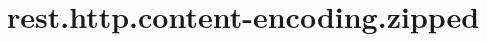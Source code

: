 \section{rest.http.content-encoding.zipped}
\label{configuration:RestHttpContentEncodingZipped}
\TODO
